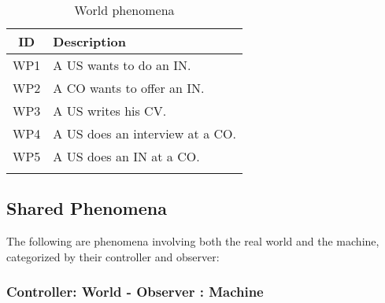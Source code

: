 \renewcommand{\arraystretch}{1.5}

\begin{longtable}{|c|p{10.5cm}|}
    \hline \rowcolor{polimiblue!40}
    \textbf{ID} & \textbf{Description} \\ \hline
    WP1 & A US wants to do an IN. \\ \hline
    WP2 & A CO wants to offer an IN. \\ \hline
    WP3 & A US writes his CV. \\ \hline
    WP4 & A US does an interview at a CO. \\ \hline
    WP5 & A US does an IN at a CO. \\ \hline
\caption{World phenomena}
\end{longtable}

\subsection{Shared Phenomena}
The following are phenomena involving both the real world and the machine, categorized by their controller and observer:

\subsubsection{Controller: World - Observer : Machine}
\renewcommand{\arraystretch}{1.5}

